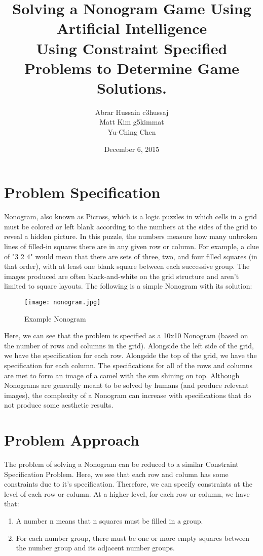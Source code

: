 \documentclass[titlepage]{article}
\title{Solving a Nonogram Game Using Artificial Intelligence \\ \small Using Constraint Specified Problems to Determine Game Solutions.  }
\author{Abrar Hussain c3hussaj \\ Matt Kim g5kimmat \\ Yu-Ching Chen }
\date{December 6, 2015}
\begin{document}
\maketitle

\section{Problem Specification}

Nonogram, also known as Picross, which is a logic puzzles in which cells in a grid must be colored or left blank according to the numbers at the sides of the grid to reveal a hidden picture. In this puzzle, the numbers measure how many unbroken lines of filled-in squares there are in any given row or column. For example, a clue of "3 2 4" would mean that there are sets of three, two, and four filled squares (in that order), with at least one blank square between each successive group. The images produced are often black-and-white on the grid structure and aren't limited to square layouts. The following is a simple Nonogram with its solution:


\begin{figure}[ht!]
\centering
\texttt{[image: nonogram.jpg]}
\caption{Example Nonogram \label{overflow}}
\end{figure}

Here, we can see that the problem is specified as a 10x10 Nonogram (based on the number of rows and columns in the grid). Alongside the left side of the grid, we have the specification for each row. Alongside the top of the grid, we have the specification for each column. The specifications for all of the rows and columns are met to form an image of a camel with the sun shining on top. Although Nonograms are generally meant to be solved by humans (and produce relevant images), the complexity of a Nonogram can increase with specifications that do not produce some aesthetic results.

\section{Problem Approach}
The problem of solving a Nonogram can be reduced to a similar Constraint Specification Problem. Here, we see that each row and column has some constraints due to it's specification. Therefore, we can specify constraints at the level of each row or column. At a higher level, for each row or column, we have that:

\begin{enumerate}
\item A number n means that n squares must be filled in a group.
\item For each number group, there must be one or more empty squares between the number group and its adjacent number groups.
\end{enumerate}
\end{document}
